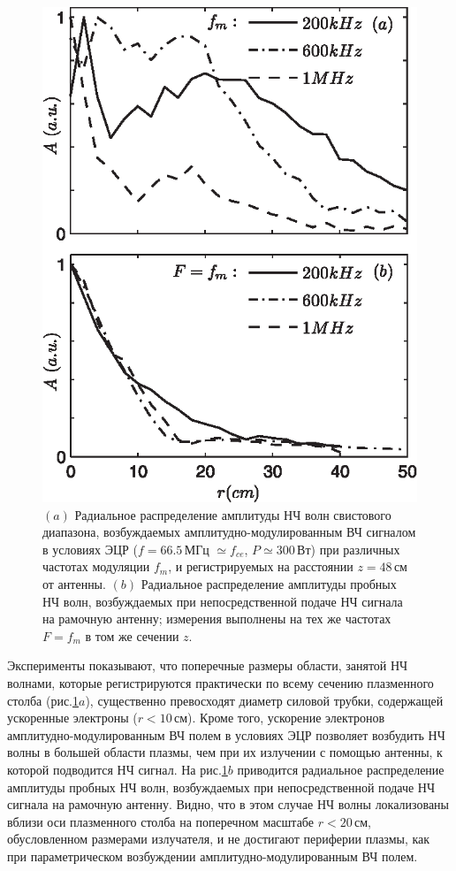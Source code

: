 \documentclass[autoref,10pt]{disser}
\begin{document}
\begin{figure}[H]
  \centering
  \includegraphics[width=0.5\columnwidth]{pics/param_vs_dir.eps}
  \caption{$(a)$ Радиальное распределение амплитуды НЧ волн свистового диапазона, возбуждаемых амплитудно-модулированным ВЧ сигналом в условиях ЭЦР ($f=66.5$\,МГц $\simeq f_{ce}$, $P\simeq 300$\,Вт) при различных частотах модуляции $f_{m}$, и регистрируемых на расстоянии $z=48$\,см от антенны. $(b)$ Радиальное распределение амплитуды пробных НЧ волн, возбуждаемых при непосредственной подаче НЧ сигнала на рамочную антенну; измерения выполнены на тех же частотах $F=f_m$ в том же сечении $z$.}
  \label{fig:param_vs_dir}
\end{figure} 
 
Эксперименты показывают, что поперечные размеры области, занятой НЧ волнами, которые регистрируются практически по всему сечению плазменного столба (\mbox{рис.\ref{fig:param_vs_dir}$a$}), существенно превосходят диаметр силовой трубки, содержащей ускоренные электроны ($r < 10$\,см). Кроме того, ускорение электронов амплитудно-мо\-ду\-ли\-ро\-ван\-ным ВЧ полем в условиях ЭЦР позволяет возбудить НЧ волны в большей области плазмы, чем при их излучении с помощью антенны, к которой подводится НЧ сигнал. На \mbox{рис.\ref{fig:param_vs_dir}$b$} приводится радиальное распределение амплитуды пробных НЧ волн, возбуждаемых при непосредственной подаче НЧ сигнала на рамочную антенну. Видно, что в этом случае НЧ волны локализованы вблизи оси плазменного столба на поперечном масштабе $r < 20$\,см, обусловленном размерами излучателя, и не достигают периферии плазмы, как при параметрическом возбуждении амплитудно-модулированным ВЧ полем.   
\end{document}
